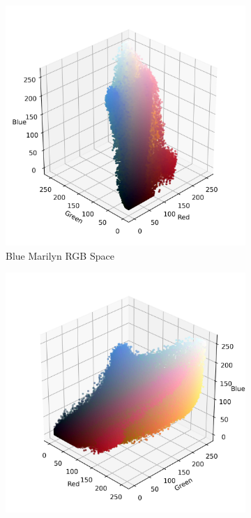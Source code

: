 \documentclass{article}
\begin{document}
\begin{figure}[ht]\ContinuedFloat
  \centering
  \begin{subfigure}{0.45\textwidth}
    \includegraphics[width=\textwidth]{main_files/figure-latex/4_15_blue_marilyn_original_scatter.jpg}
    \caption{Blue Marilyn RGB Space}
    \label{fig:4_15_blue_marilyn_original_scatter}
  \end{subfigure}
  \hfill
  \begin{subfigure}{0.45\textwidth}
    \includegraphics[width=\textwidth]{main_files/figure-latex/4_16_blue_marilyn_original_scatter.jpg}

\end{subfigure}
\end{figure}
\end{document}
